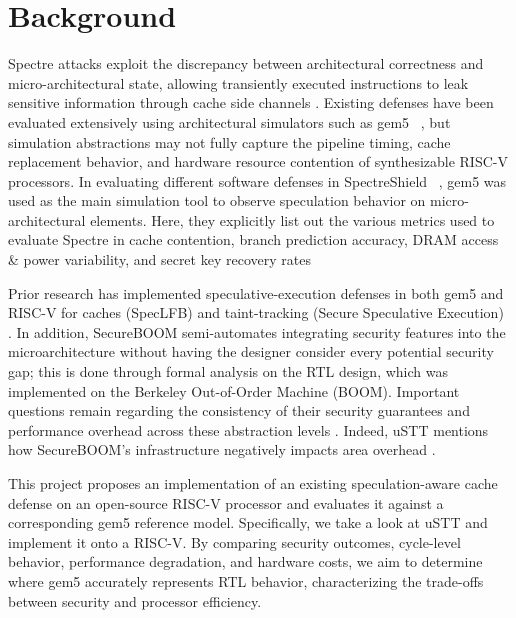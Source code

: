 \section{Background}
\label{sec:background}

Spectre attacks exploit the discrepancy between architectural correctness and micro-architectural state, allowing transiently executed instructions to leak sensitive information through cache side channels \cite{SpectreBase}. Existing defenses have been evaluated extensively using architectural simulators such as gem5 ~\cite{Narayan:HFI:2024}, but simulation abstractions may not fully capture the pipeline timing, cache replacement behavior, and hardware resource contention of synthesizable RISC-V processors. In evaluating different software defenses in SpectreShield ~\cite{Khan:SpectreDef:2025}, gem5 was used as the main simulation tool to observe speculation behavior on micro-architectural elements. Here, they explicitly list out the various metrics used to evaluate Spectre in cache contention, branch prediction accuracy, DRAM access \& power variability, and secret key recovery rates

Prior research has implemented speculative-execution defenses in both gem5 and RISC-V for caches (SpecLFB) \cite{Cheng:SpecLFB:2024} and taint-tracking (Secure Speculative Execution) \cite{sabbagh2021secure}. In addition, SecureBOOM semi-automates integrating security features into the microarchitecture without having the designer consider every potential security gap; this is done through formal analysis on the RTL design, which was implemented on the Berkeley Out-of-Order Machine (BOOM). Important questions remain regarding the consistency of their security guarantees and performance overhead across these abstraction levels \cite{Jauch:SecureBOOM:2023}. Indeed, uSTT mentions how SecureBOOM's infrastructure negatively impacts area overhead \cite{Chen:uSTT:2025}.

This project proposes an implementation of an existing speculation-aware cache defense on an open-source RISC-V processor and evaluates it against a corresponding gem5 reference model. Specifically, we take a look at uSTT and implement it onto a RISC-V. By comparing security outcomes, cycle-level behavior, performance degradation, and hardware costs, we aim to determine where gem5 accurately represents RTL behavior, characterizing the trade-offs between security and processor efficiency.
